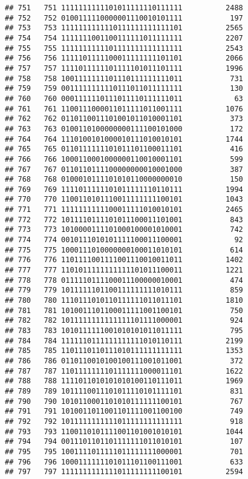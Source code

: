 \documentclass[]{article}
\begin{document}
\begin{verbatim}
## 751   751 1111111111101011111110111111          2488
## 752   752 0100111110000001110010101111           197
## 753   753 1111111111110111111111111101          2565
## 754   754 1111111001100111111011111111          2207
## 755   755 1111111111101111111111111111          2543
## 756   756 1111101111100011111111101101          2066
## 757   757 1111011111101111101011101111          1996
## 758   758 1001111111101110111111111011           731
## 759   759 0011111111110111011011111111           130
## 760   760 0001111110111011110111111011            63
## 761   761 1100111000011011111011001111          1076
## 762   762 0110110011101001011010001101           373
## 763   763 0100110100000000111100101000           172
## 764   764 1110100101000010111010010101          1744
## 765   765 0110111111101011101100011101           416
## 766   766 1000110001000000110010001101           599
## 767   767 0110110111100000000010001000           387
## 768   768 0100010111101010110000000010           150
## 769   769 1111011111101011111110110111          1994
## 770   770 1100110101110011111111100101          1043
## 771   771 1111111111100011111010010101          2465
## 772   772 1011110111101011100011101001           843
## 773   773 1010000111101000100001010001           742
## 774   774 0010111010101111100011100001            92
## 775   775 1000111010000000100011010101           614
## 776   776 1101111001111001110010011011          1402
## 777   777 1101011111111111101011100011          1221
## 778   778 0111110111100011100000010001           474
## 779   779 1011111101100111111111010111           859
## 780   780 1110111010110111111011011101          1810
## 781   781 1010011101100011111001100101           750
## 782   782 1011111111111111101111000001           924
## 783   783 1010111111001010101011011111           795
## 784   784 1111110111111111111010110111          2199
## 785   785 1101110110111010111111111111          1353
## 786   786 0110110010100100111001011001           372
## 787   787 1101111111101111111000011101          1622
## 788   788 1111011010101010100110111011          1969
## 789   789 1011110011101011110101111101           831
## 790   790 1010110001101010111111100101           767
## 791   791 1010011011001101111001100100           749
## 792   792 1011111111111011111111111111           918
## 793   793 1100110101111001101001010101          1044
## 794   794 0011101101101111111011010101           107
## 795   795 1001111011111011111111000001           701
## 796   796 1000111111101011101100111001           633
## 797   797 1111111111111011111111100101          2594

\end{verbatim}
\end{document}
